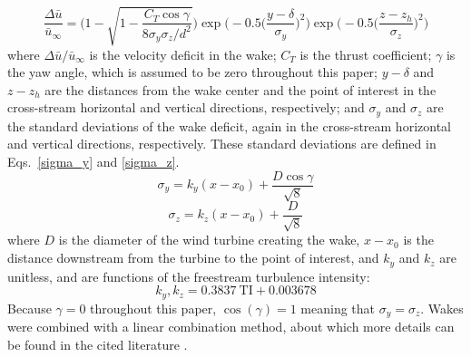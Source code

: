 \documentclass[wes, manuscript]{copernicus}
\begin{document}
\begin{equation}
    \label{wake-model}
    \frac{\Delta\bar{u}}{\bar{u}_{\infty}} = \Bigg(1 - \sqrt{1 - \frac{C_T \cos{\gamma}}{8\sigma_y\sigma_z/d^2}}  \Bigg) \exp{\bigg(-0.5\Big(\frac{y-\delta}{\sigma_y} \Big)^2}\bigg) \exp{\bigg(-0.5\Big(\frac{z-z_h}{\sigma_z} \Big)^2}\bigg)
\end{equation}
%
\noindent where $\Delta\bar{u}/\bar{u}_{\infty}$ is the velocity deficit in the wake; $C_T$ is the thrust coefficient; $\gamma$ is the yaw angle, which is assumed to be zero throughout this paper; $y-\delta$ and $z-z_h$ are the distances from the wake center and the point of interest in the cross-stream horizontal and vertical directions, respectively; and $\sigma_y$ and $\sigma_z$ are the standard deviations of the wake deficit, again in the cross-stream horizontal and vertical directions, respectively. These standard deviations are defined in Eqs.~\ref{sigma_y} and \ref{sigma_z}.
%
\begin{equation}
    \label{sigma_y}
    \sigma_y = k_y(x-x_0) + \frac{D\cos{\gamma}}{\sqrt{8}}
\end{equation}
%
\begin{equation}
    \label{sigma_z}
    \sigma_z = k_z(x-x_0) + \frac{D}{\sqrt{8}}
\end{equation}
%
\noindent where $D$ is the diameter of the wind turbine creating the wake, $x-x_0$ is the distance downstream from the turbine to the point of interest, and $k_y$ and $k_z$ are unitless, and are functions of the freestream turbulence intensity:
%
\begin{equation}
    \label{turbulence}
    k_y,k_z = 0.3837~\text{TI}+0.003678
\end{equation}
%
Because $\gamma=0$ throughout this paper, $\cos(\gamma)=1$ meaning that $\sigma_y=\sigma_z$. 
Wakes were combined with a linear combination method, about which more details can be found in the cited literature \citep{bastankhah2016experimental,Thomas2018}.
\end{document}
